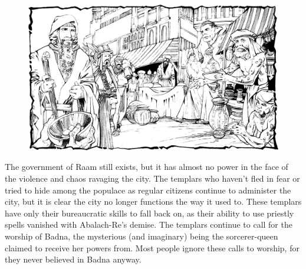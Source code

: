 {
\begin{figure}[b!]
\centering
\includegraphics[width=\textwidth]{images/raam-2.png}
\WOTC
\end{figure}

	The government of Raam still exists, but it has almost no power in the face of the violence and chaos ravaging the city. The templars who haven't fled in fear or tried to hide among the populace as regular citizens continue to administer the city, but it is clear the city no longer functions the way it used to. These templars have only their bureaucratic skills to fall back on, as their ability to use priestly spells vanished with Abalach-Re's demise. The templars continue to call for the worship of Badna, the mysterious (and imaginary) being the sorcerer-queen claimed to receive her powers from. Most people ignore these calls to worship, for they never believed in Badna anyway.
}
